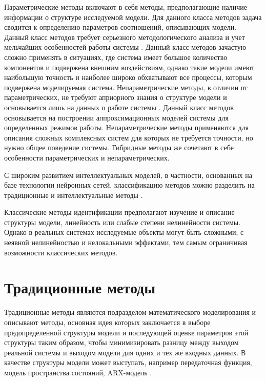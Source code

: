 Параметрические методы включают в себя методы, предполагающие наличие
информации о структуре исследуемой модели. Для данного класса методов задача
сводится к определению параметров соотношений, описывающих модели. Данный класс
методов требует серьезного методологического анализа и учет мельчайших
особенностей работы системы \cite{bib:ident:simulation}. Данный класс методов зачастую сложно применять в
ситуациях, где система имеет большое количество компонентов и подвержена
внешним воздействиям, однако такие модели имеют наибольшую точность и наиболее
широко обхватывают все процессы, которым подвержена моделируемая система.
Непараметрические методы, в отличии от параметрических,
не требуют априорного знания о структуре модели и основывается лишь на данных о
работе системы \cite{bib:ident:arrays}. Данный класс методов основывается на построении
аппроксимационных моделей системы для определенных режимов работы.
Непараметрические методы применяются для описания сложных комплексных систем
для которых не требуется точности, но нужно общее поведение системы. Гибридные
методы же сочетают в себе особенности параметрических и непараметрических. 

С широким развитием интеллектуальных моделей, в частности, основанных на базе
технологии нейронных сетей, классификацию методов можно разделить на
традиционные и интеллектуальные методы \cite{bib:ident:neural:modelling}.

Классические методы идентификации предполагают изучение и описание структуры
модели, линейность или слабые степени нелинейности системы. Однако в реальных
системах исследуемые объекты могут быть сложными, с неявной нелинейностью и
нелокальными эффектами, тем самым ограничивая возможности классических методов. 

\section{Традиционные методы}

Традиционные методы являются подразделом математического моделирования и
описывают методы, основная идея которых заключается в выборе предопределенной
структуры модели и последующей оценке
параметров этой структуры таким образом, чтобы минимизировать разницу между
выходом реальной системы и выходом модели для одних и тех же входных данных.
В качестве структуры модели может выступать, например передаточная функция,
модель пространства состояний, ARX-модель . 

